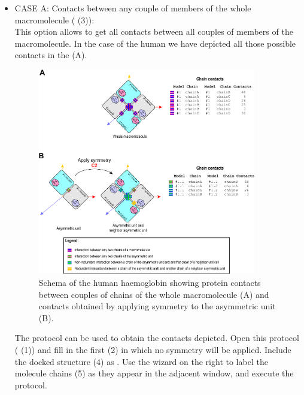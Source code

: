     \begin{itemize}
    
\item CASE A: Contacts between any couple of members of the whole macromolecule ( (3)):\\
 This option allows to get all contacts between all couples of members of the macromolecule. In the case of the human  we have depicted all those possible contacts in the  (A).
 
 \begin{figure}[H]
            \centering 
            \captionsetup{width=.9\linewidth} 
            \includegraphics[width=0.9\textwidth]{Images/Fig49}
            \caption{Schema of the human haemoglobin  showing protein contacts between couples of chains of the whole macromolecule (A) and contacts obtained by applying symmetry to the asymmetric unit (B).}
            \label{fig:schema_contacts}
        \end{figure}
 
 
 The protocol  can be used to obtain the contacts depicted. Open this protocol ( (1)) and fill in the first  (2) in which no symmetry will be applied. Include the docked  structure (4) as . Use the wizard on the right to label the molecule chains (5) as they appear in the adjacent window, and execute the protocol. 
 

\end{itemize}
